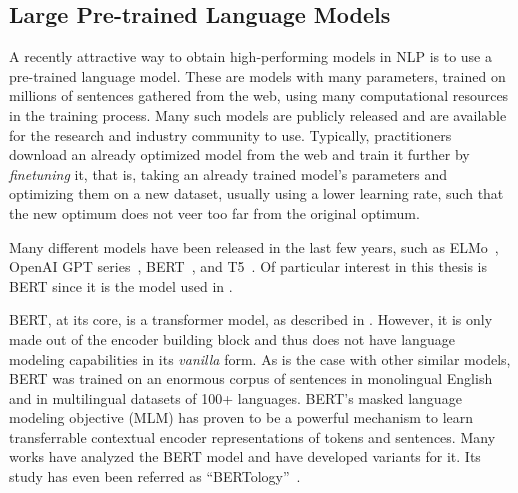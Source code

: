 \subsection{Large Pre-trained Language Models}
\label{sec:pretrained-bg}

\noindent A recently attractive way to obtain high-performing models in NLP is
to use a pre-trained language model. These are models with many
parameters, trained on millions of sentences gathered from
the web, using many computational resources in the training process.
Many such models are publicly released and are
available for the research and industry community to use. Typically,
practitioners download an already optimized model from the web and
train it further by \textit{finetuning} it, that is, taking an
already trained model's parameters and optimizing them on a new
dataset, usually using a lower learning rate, such that the new
optimum does not veer too far from the original optimum.

Many different models have been released in the last few years, such
as ELMo~\citep{peters2018deep}, OpenAI GPT
series~\citep{radford2018improving, brown2020language},
BERT~\citep{devlin2018bert}, and
T5~\citep{raffel2020Exploringlimitstransfer}. Of particular interest
in this thesis is BERT since it is the model used in
.

BERT, at its core, is a transformer model, as described in
. However, it is only made out of the
encoder building block and thus does not have language modeling
capabilities in its \textit{vanilla} form. As is the case with other
similar models, BERT was trained on an enormous corpus of sentences
in monolingual English and in multilingual datasets of 100+
languages. BERT's masked language modeling objective (MLM) has proven
to be a powerful mechanism to learn transferrable contextual encoder
representations of tokens and sentences. Many works have analyzed
the BERT model and have developed variants for it. Its study has even
been referred as ``BERTology''~\citep{rogers2020PrimerBERTologyWhat}.
